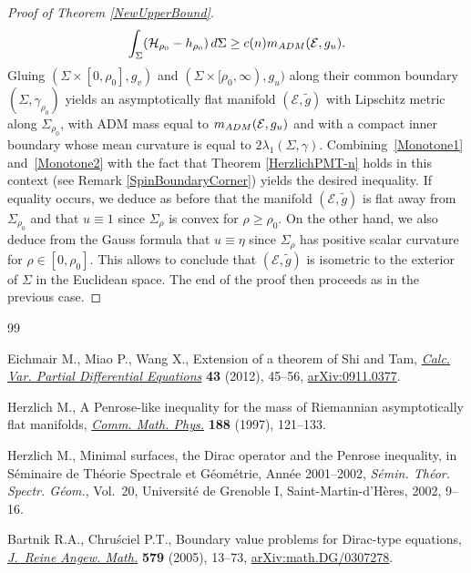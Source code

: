 \documentclass[10pt,a4paper]{article}
\numberwithin{equation}{section}
\theoremstyle{definition}
\begin{document}
\begin{proof}[Proof of Theorem \ref{NewUpperBound}]
\begin{gather}\label{Monotone2}
\int_{\Sigma}(\mathcal{H}_{\rho_0}-h_{\rho_0})\,{\rm d}\Sigma\geq c(n)m_{\rm ADM}(\mathcal{E},g_u).
\end{gather}
Gluing $(\Sigma\times[0,\rho_0],g_v)$ and $(\Sigma\times[\rho_0,\infty),g_u)$ along their common boundary $(\Sigma,\gamma_{\rho_0})$ yields an asymptotically flat manifold $(\mathcal{E},\widetilde{g})$ with Lipschitz metric along $\Sigma_{\rho_0}$, with ADM mass equal to $m_{\rm ADM}(\mathcal{E},g_u)$ and with a compact inner boundary whose mean curvature is equal to $2\lambda_1(\Sigma,\gamma)$. Combining~\eqref{Monotone1} and~\eqref{Monotone2} with the fact that Theorem \ref{HerzlichPMT-n} holds in this context (see Remark \ref{SpinBoundaryCorner}) yields the desired inequality. If equality occurs, we deduce as before that the manifold $(\mathcal{E},\widetilde{g})$ is flat away from $\Sigma_{\rho_0}$ and that $u\equiv 1$ since $\Sigma_\rho$ is convex for $\rho\geq \rho_0$. On the other hand, we also deduce from the Gauss formula that $u\equiv \eta$ since $\Sigma_\rho$ has positive scalar curvature for $\rho\in[0,\rho_0]$. This allows to conclude that $(\mathcal{E},\widetilde{g})$ is isometric to the exterior of $\Sigma$ in the Euclidean space. The end of the proof then proceeds as in the previous case.
\end{proof}

\begin{thebibliography}{99}

Eichmair M., Miao P., Wang X., Extension of a theorem of {S}hi and {T}am,
 \href{https://doi.org/10.1007/s00526-011-0402-2}{\textit{Calc. Var. Partial Differential Equations}} \textbf{43} (2012),
 45--56, \href{https://arxiv.org/abs/0911.0377}{arXiv:0911.0377}.


Herzlich M., A {P}enrose-like inequality for the mass of {R}iemannian
 asymptotically flat manifolds, \href{https://doi.org/10.1007/s002200050159}{\textit{Comm. Math. Phys.}} \textbf{188}
 (1997), 121--133.


Herzlich M., Minimal surfaces, the {D}irac operator and the {P}enrose
 inequality, in S\'eminaire de {T}h\'eorie {S}pectrale et {G}\'eom\'etrie, {A}nn\'ee 2001--2002, \textit{S\'emin. Th\'eor. Spectr. G\'eom.}, Vol.~20,
 Universit\'e de Grenoble I, Saint-Martin-d'H\`eres, 2002, 9--16.


Bartnik R.A., Chru\'sciel P.T., Boundary value problems for {D}irac-type
 equations, \href{https://doi.org/10.1515/crll.2005.2005.579.13}{\textit{J.~Reine Angew. Math.}} \textbf{579} (2005), 13--73,
 \href{https://arxiv.org/abs/math.DG/0307278}{arXiv:math.DG/0307278}.


\end{thebibliography}
\end{document}
